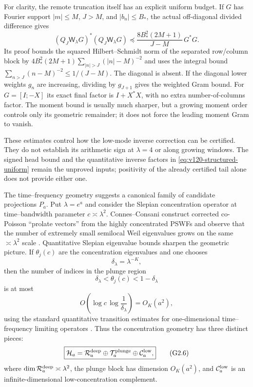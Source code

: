 \documentclass[11pt]{article}
\theoremstyle{remark}
\begin{document}
For clarity, the remote truncation itself has an explicit uniform
budget. If $G$ has Fourier support $|m|\le M$, $J>M$, and
$|b_n|\le B_*$, the actual off-diagonal divided difference gives
\begin{equation}\label{eq:v120-separated-uniform-budget}
 (Q_J\mathsf W_\lambda G)^*(Q_J\mathsf W_\lambda G)
 \preceq\frac{8B_*^2(2M+1)}{J-M}\,G^*G.
\end{equation}
Its proof bounds the squared Hilbert--Schmidt norm of the separated
row/column block by
$4B_*^2(2M+1)\sum_{|n|>J}(|n|-M)^{-2}$ and uses the
integral bound $\sum_{n>J}(n-M)^{-2}\le1/(J-M)$.
The diagonal is absent. If the diagonal lower weights $g_n$ are increasing,
dividing by $g_{J+1}$ gives the weighted Gram bound. For
$G=[I;-X]$ its exact final factor is $I+X^*X$, with no extra
number-of-columns factor. The moment bound is usually much sharper,
but a growing moment order controls only its geometric remainder;
it does not force the leading moment Gram to vanish.

These estimates control how the low-mode inverse correction can be
certified. They do not establish its arithmetic sign at $\lambda=4$
or along growing windows. The signed head bound and the quantitative
inverse factors in \eqref{eq:v120-structured-uniform} remain the
unproved inputs; positivity of the already certified tail alone does
not provide either one.


The time--frequency geometry suggests a canonical family of candidate projections $P_a$.  Put $\lambda=e^a$ and consider the Slepian concentration operator at time--bandwidth parameter $c\asymp\lambda^2$.  Connes--Consani construct corrected co-Poisson ``prolate vectors'' from the highly concentrated PSWFs and observe that the number of extremely small semilocal Weil eigenvalues grows on the same $\asymp\lambda^2$ scale \cite{ConnesConsani2023}.  Quantitative Slepian eigenvalue bounds sharpen the geometric picture.  If $\theta_j(c)$ are the concentration eigenvalues and one chooses
\[
 \delta_\lambda=\lambda^{-K},
\]
then the number of indices in the plunge region
\[
 \delta_\lambda<\theta_j(c)<1-\delta_\lambda
\]
is at most
\[
 O\!\left(\log c\,\log\frac1{\delta_\lambda}\right)=O_K(a^2),
 \tag{G2.5}
\]
using the standard quantitative transition estimates for one-dimensional time--frequency limiting operators \cite{SlepianTransition}.  Thus the concentration geometry has three distinct pieces:
\[
 \boxed{
 \mathcal H_a
 =\mathcal R_a^{\rm deep}\oplus
   \mathcal T_a^{\rm plunge}\oplus
   \mathcal C_a^{\rm low},
 }
 \tag{G2.6}
\]
where $\dim\mathcal R_a^{\rm deep}\asymp\lambda^2$, the plunge block has dimension $O_K(a^2)$, and $\mathcal C_a^{\rm low}$ is an infinite-dimensional low-concentration complement.
\end{document}
